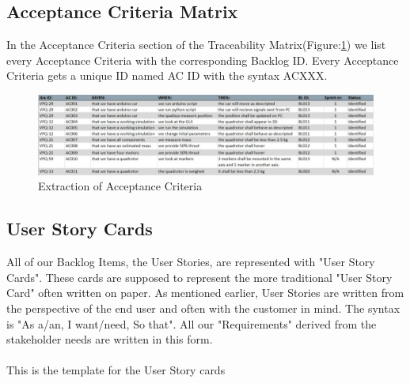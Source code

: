 \newpage

\subsection{Acceptance Criteria Matrix}
In the Acceptance Criteria section of the Traceability Matrix(Figure:\ref{fig:acm}) we list every Acceptance Criteria with the corresponding Backlog ID. Every Acceptance Criteria gets a unique ID named AC ID with the syntax ACXXX. 
\begin{figure}[h]
    \centering
        \includegraphics[width = 1\textwidth]{VAPIQ-PICTURES/AC}
    \caption{Extraction of Acceptance Criteria}
    \label{fig:acm}
\end{figure}

\newpage

\subsection{User Story Cards}
All of our Backlog Items, the User Stories, are represented with "User Story Cards". These cards are supposed to represent the more traditional "User Story Card" often written on paper. As mentioned earlier, User Stories are written from the perspective of the end user and often with the customer in mind. The syntax is "As a/an, I want/need, So that". All our "Requirements" derived from the stakeholder needs are written in this form. \\ 
\\
This is the template for the User Story cards 

\krav{}{}{}{}{}{}{}


